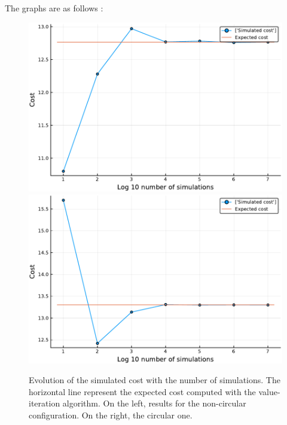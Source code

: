 The graphs are as follows :

\begin{figure}[H]
\centering
\includegraphics[scale=0.41]{../img/board_left_high/cost_iterations_log_noncirc.pdf}
\includegraphics[scale=0.41]{../img/board_left_high/cost_iterations_log_circ.pdf}
\caption{Evolution of the simulated cost with the number of simulations. The horizontal line represent the expected cost computed with the value-iteration algorithm. On the left, results for the non-circular configuration. On the right, the circular one.}
\label{fig:cost_iterations_log_left}
\end{figure}

